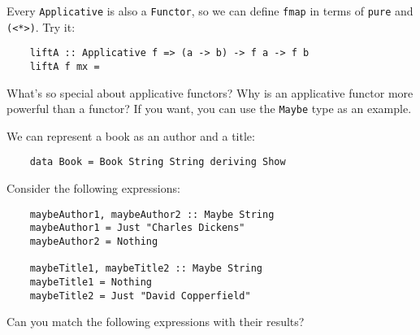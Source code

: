 \documentclass[a4paper,10pt,addpoints]{exam}
\begin{document}
\begin{questions}


  \question[1]

  Every \texttt{Applicative} is also a \texttt{Functor}, so we can
  define \texttt{fmap} in terms of \texttt{pure} and
  \texttt{(<*>)}. Try it:

  \begin{verbatim}
    liftA :: Applicative f => (a -> b) -> f a -> f b
    liftA f mx =
  \end{verbatim}


  \question[1]

  What's so special about applicative functors? Why is an applicative
  functor more powerful than a functor? If you want, you can use the
  \texttt{Maybe} type as an example.


  \newpage

  \question[1]

  We can represent a book as an author and a title:

  \begin{verbatim}
    data Book = Book String String deriving Show
  \end{verbatim}

  Consider the following expressions:

  \begin{verbatim}
    maybeAuthor1, maybeAuthor2 :: Maybe String
    maybeAuthor1 = Just "Charles Dickens"
    maybeAuthor2 = Nothing

    maybeTitle1, maybeTitle2 :: Maybe String
    maybeTitle1 = Nothing
    maybeTitle2 = Just "David Copperfield"
  \end{verbatim}

  Can you match the following expressions with their results?

  \vspace{0.15in}

\end{questions}
\end{document}
